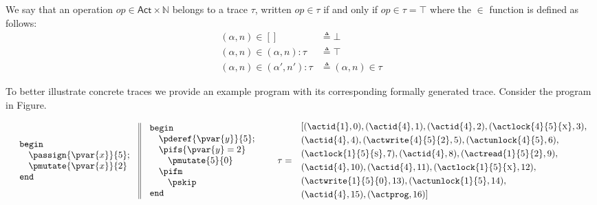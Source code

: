 We say that an operation $op \in \mathsf{Act} \times \mathds{N}$ belongs to a trace $\tau$, written $op \in \tau$ if and only if $op \in \tau = \top$ where the $\in$ function is defined as follows:
\begin{align*}
	(\alpha, n) \in [] &\triangleq \bot \\
	(\alpha, n) \in (\alpha, n):\tau &\triangleq \top \\
	(\alpha, n) \in (\alpha', n'):\tau &\triangleq (\alpha, n) \in \tau
\end{align*}

To better illustrate concrete traces we provide an example program with its corresponding formally generated trace. Consider the program in Figure.

\[
	\begin{array}{l r}
		\begin{array}{l || l}
			\begin{array}{l}
				\mathtt{begin} \\
					\quad \passign{\pvar{x}}{5} ; \\
					\quad \pmutate{\pvar{x}}{2} \\
				\mathtt{end}
			\end{array}
				&
			\begin{array}{l}
				\mathtt{begin} \\
					\quad \pderef{\pvar{y}}{5} ; \\
					\quad \pifs{\pvar{y} = 2} \\
					\quad \quad \pmutate{5}{0} \\
					\quad \pifm \\
					\quad \quad \pskip \\
				\mathtt{end}
			\end{array}
		\end{array}
		&
		\begin{array}{r l}
			\tau =
			&
			\begin{aligned}
				&[(\actid{1}, 0), (\actid{4}, 1), (\actid{4}, 2), (\actlock{4}{5}{\textsc{x}}, 3), \\
				&(\actid{4}, 4), (\actwrite{4}{5}{2}, 5), (\actunlock{4}{5}, 6), \\
				&(\actlock{1}{5}{\textsc{s}}, 7), (\actid{4}, 8), (\actread{1}{5}{2}, 9), \\
				&(\actid{4}, 10), (\actid{4}, 11), (\actlock{1}{5}{\textsc{x}}, 12), \\
				&(\actwrite{1}{5}{0}, 13),  (\actunlock{1}{5}, 14), \\
				&(\actid{4}, 15), (\actprog, 16)]
			\end{aligned}
		\end{array}
	\end{array}
\]

